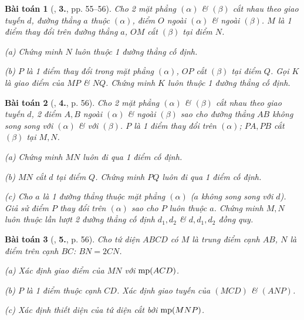 \documentclass{article}
\numberwithin{equation}{section}
\newtheorem{baitoan}{Bài toán}[section]
\begin{document}
\begin{baitoan}[\cite{TL_chuyen_Toan_Hinh_Hoc_11}, \textbf{3.}, pp. 55--56]
	Cho 2 mặt phẳng $(\alpha)$ \& $(\beta)$ cắt nhau theo giao tuyến $d$, đường thẳng $a$ thuộc $(\alpha)$, điểm $O$ ngoài $(\alpha)$ \& ngoài $(\beta)$. $M$ là 1 điểm thay đổi trên đường thẳng $a$, $OM$ cắt $(\beta)$ tại điểm $N$.
	\begin{enumerate*}
		\item[(a)] Chứng minh $N$ luôn thuộc 1 đường thẳng cố định.
		\item[(b)] $P$ là 1 điểm thay đổi trong mặt phẳng $(\alpha)$, $OP$ cắt $(\beta)$ tại điểm $Q$. Gọi $K$ là giao điểm của $MP$ \& $NQ$. Chứng minh $K$ luôn thuộc 1 đường thẳng cố định.
	\end{enumerate*}	
\end{baitoan}

\begin{baitoan}[\cite{TL_chuyen_Toan_Hinh_Hoc_11}, \textbf{4.}, p. 56]
	Cho 2 mặt phẳng $(\alpha)$ \& $(\beta)$ cắt nhau theo giao tuyến $d$, 2 điểm $A,B$ ngoài $(\alpha)$ \& ngoài $(\beta)$ sao cho đường thẳng $AB$ không song song với $(\alpha)$ \& với $(\beta)$. $P$ là 1 điểm thay đổi trên $(\alpha)$; $PA,PB$ cắt $(\beta)$ tại $M,N$.
	\begin{enumerate*}
		\item[(a)] Chứng minh $MN$ luôn đi qua 1 điểm cố định.
		\item[(b)] $MN$ cắt $d$ tại điểm $Q$. Chứng minh $PQ$ luôn đi qua 1 điểm cố định.
		\item[(c)] Cho $a$ là 1 đường thẳng thuộc mặt phẳng $(\alpha)$ ($a$ không song song với $d$). Giả sử điểm $P$ thay đổi trên $(\alpha)$ sao cho $P$ luôn thuộc $a$. Chứng minh $M,N$ luôn thuộc lần lượt 2 đường thẳng cố định $d_1,d_2$ \& $d,d_1,d_2$ đồng quy.
	\end{enumerate*}
\end{baitoan}

\begin{baitoan}[\cite{TL_chuyen_Toan_Hinh_Hoc_11}, \textbf{5.}, p. 56]
	Cho tứ diện $ABCD$ có $M$ là trung điểm cạnh $AB$, $N$ là điểm trên cạnh $BC$: $BN = 2CN$.
	\begin{enumerate*}
		\item[(a)] Xác định giao điểm của $MN$ với ${\rm mp}(ACD)$.
		\item[(b)] $P$ là 1 điểm thuộc cạnh $CD$. Xác định giao tuyến của $(MCD)$ \& $(ANP)$.
		\item[(c)] Xác định thiết diện của tứ diện cắt bởi ${\rm mp}(MNP)$.
	\end{enumerate*}
\end{baitoan}
\end{document}
